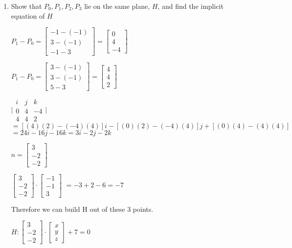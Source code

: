 \documentclass{article}
\begin{document}
    \begin{enumerate}
        \item Show that $P_0, P_1, P_2, P_3 $ lie on the same plane, $H$, and find the implicit equation of $H$

        $P_1 - P_0 = \begin{bmatrix} -1 - (-1) \\ 3 - (-1) \\ -1 - 3 \end{bmatrix} = \begin{bmatrix} 0 \\ 4 \\ -4 \end{bmatrix}$

        $P_1 - P_0 = \begin{bmatrix} 3 - (-1) \\ 3 - (-1) \\ 5 - 3 \end{bmatrix} = \begin{bmatrix} 4 \\ 4 \\ 2 \end{bmatrix}$

        $ \Bigg | \begin{matrix}
            i & j & k \\
            0 & 4 & -4 \\
            4 & 4 & 2
        \end{matrix} \Bigg |$
        $ = [(4)(2) - (-4)(4)]i - [(0)(2) - (-4)(4)]j + [(0)(4) - (4)(4)]$
        $ = 24i - 16j -16k = 3i - 2j - 2k$

        $n = \begin{bmatrix} 3 \\ -2 \\ -2 \end{bmatrix}$

        $\begin{bmatrix} 3 \\ -2 \\ -2 \end{bmatrix} \cdot \begin{bmatrix} -1 \\ -1 \\ 3 \end{bmatrix} $
        $ = -3 + 2 - 6 = -7$

        Therefore we can build H out of these 3 points.

        $H : \begin{bmatrix} 3 \\ -2 \\ -2 \end{bmatrix} \cdot \begin{bmatrix} x \\ y \\ z \end{bmatrix} + 7 = 0$


\end{enumerate}
\end{document}
